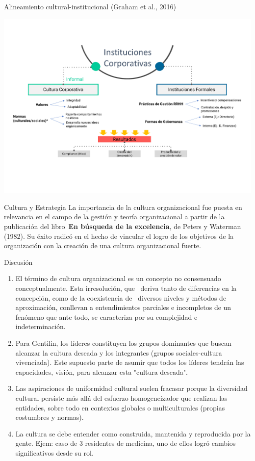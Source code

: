 \documentclass[aspectratio=169]{beamer}
\begin{document}
	\begin{frame}{Alineamiento cultural-institucional (Graham et al., 2016)}
		\begin{center}
			\includegraphics[height=\textheight]{./figures/L11.pdf}
		\end{center}
	\end{frame}
	
	\begin{frame}{Cultura y Estrategia}
		La importancia de la cultura organizacional fue puesta en relevancia en el campo de la gestión y teoría organizacional a partir de la publicación del libro \textbf{En búsqueda de la excelencia}, de Peters y Waterman (1982). Su éxito radicó en el hecho de vincular el logro de los objetivos de la organización con la creación de una cultura organizacional fuerte.
		\end{frame}
	
	\begin{frame}{Discusión}
		\begin{enumerate}
			\item El término de cultura organizacional es un concepto no consensuado conceptualmente. Esta irresolución, que  deriva tanto de diferencias en la concepción, como de la coexistencia de  diversos niveles y métodos de aproximación, conllevan a entendimientos parciales e incompletos de un fenómeno que ante todo, se caracteriza por su complejidad e indeterminación. 
			\item Para Gentilin, los líderes constituyen los grupos dominantes que buscan alcanzar la cultura deseada y los integrantes (grupos sociales-cultura vivenciada). Este supuesto parte de asumir que todos los líderes tendrán las capacidades, visión, para alcanzar esta "cultura deseada". 
			\item Las aspiraciones de uniformidad cultural suelen fracasar porque la diversidad cultural persiste más allá del esfuerzo homogeneizador que realizan las entidades, sobre todo en contextos globales o multiculturales (propias costumbres y normas). 
			\item La cultura se debe entender como construida, mantenida y reproducida por la gente. Ejem: caso de 3 residentes de medicina, uno de ellos logró cambios significativos desde su rol. 
			
		\end{enumerate}
	\end{frame}
\end{document}
